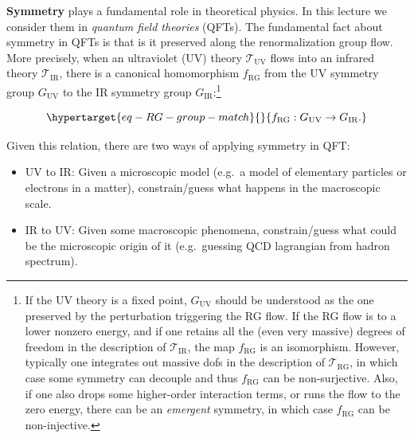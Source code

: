 \documentclass[
  letterpaper,
  DIV=11,
  numbers=noendperiod]{scrreport}
\providecommand{\tightlist}{%
  \setlength{\itemsep}{0pt}\setlength{\parskip}{0pt}}\usepackage{longtable,booktabs,array}
\begin{document}
\textbf{Symmetry} plays a fundamental role in theoretical physics. In
this lecture we consider them in \emph{quantum field theories} (QFTs).
The fundamental fact about symmetry in QFTs is that is it preserved
along the renormalization group flow. More precisely, when an
ultraviolet (UV) theory \(\mathcal{T}_\text{UV}\) flows into an infrared
theory \(\mathcal{T}_\text{IR}\), there is a canonical homomorphism
\(f_\text{RG}\) from the UV symmetry group \(G_\text{UV}\) to the IR
symmetry group \(G_\text{IR}\):\footnote{If the UV theory is a fixed
  point, \(G_\text{UV}\) should be understood as the one preserved by
  the perturbation triggering the RG flow. If the RG flow is to a lower
  nonzero energy, and if one retains all the (even very massive) degrees
  of freedom in the description of \(\mathcal{T}_\text{IR}\), the map
  \(f_\text{RG}\) is an isomorphism. However, typically one integrates
  out massive dofs in the description of \(\mathcal{T}_\text{RG}\), in
  which case some symmetry can decouple and thus \(f_\text{RG}\) can be
  non-surjective. Also, if one also drops some higher-order interaction
  terms, or runs the flow to the zero energy, there can be an
  \emph{emergent} symmetry, in which case \(f_\text{RG}\) can be
  non-injective.}

\begin{tcolorbox}[enhanced jigsaw, colback=white, toprule=.15mm, left=2mm, coltitle=black, opacityback=0, colbacktitle=quarto-callout-important-color!10!white, rightrule=.15mm, breakable, toptitle=1mm, titlerule=0mm, colframe=quarto-callout-important-color-frame, bottomtitle=1mm, title=\textcolor{quarto-callout-important-color}{\faExclamation}\hspace{0.5em}{\textsf{RG flow homomorphism from UV symmetry to IR symmetry}}, bottomrule=.15mm, opacitybacktitle=0.6, arc=.35mm, leftrule=.75mm]

\begin{equation}\protect\hypertarget{eq-RG-group-match}{}{
f_\text{RG} : G_\text{UV} \to G_\text{IR}.
}\label{eq-RG-group-match}\end{equation}

\end{tcolorbox}

Given this relation, there are two ways of applying symmetry in QFT:

\begin{itemize}
\tightlist
\item
  UV to IR: Given a microscopic model (e.g.~a model of elementary
  particles or electrons in a matter), constrain/guess what happens in
  the macroscopic scale.
\item
  IR to UV: Given some macroscopic phenomena, constrain/guess what could
  be the microscopic origin of it (e.g.~guessing QCD lagrangian from
  hadron spectrum).
\end{itemize}
\end{document}

